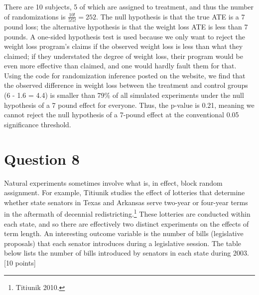 \documentclass[11pt,notitlepage]{article}\usepackage[]{graphicx}\usepackage[]{color}
\begin{document}
There are 10 subjects, 5 of which are assigned to treatment, and thus the number of randomizations is $\frac{10!}{5!5!}=252$.  The null hypothesis is that the true ATE is a 7 pound loss; the alternative hypothesis is that the weight loss ATE is less than 7 pounds.  A one-sided hypothesis test is used because we only want to reject the weight loss program's claims if the observed weight loss is less than what they claimed; if they understated the degree of weight loss, their program would be even more effective than claimed, and one would hardly fault them for that.  Using the code for randomization inference posted on the website, we find that the observed difference in weight loss between the treatment and control groups (6 - 1.6 = 4.4) is smaller than 79\% of all simulated experiments under the null hypothesis of a 7 pound effect for everyone.  Thus, the p-value is 0.21, meaning we cannot reject the null hypothesis of a 7-pound effect at the conventional 0.05 significance threshold.

\section*{Question 8}


Natural experiments sometimes involve what is, in effect, block random assignment. For example, Titiunik studies the effect of lotteries that determine whether state senators in Texas and Arkansas serve two-year or four-year terms in the aftermath of decennial redistricting.\footnote{Titiunik 2010.} These lotteries are conducted within each state, and so there are effectively two distinct experiments on the effects of term length. An interesting outcome variable is the number of bills (legislative proposals) that each senator introduces during a legislative session. The table below lists the number of bills introduced by senators in each state during 2003. [10 points]
\end{document}
